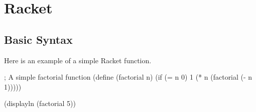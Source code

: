 
\section{Racket}

\lipsum[1] %

\subsection{Basic Syntax}
Here is an example of a simple Racket function.
\begin{racketcode}
; A simple factorial function
(define (factorial n)
  (if (= n 0)
      1
      (* n (factorial (- n 1)))))

(displayln (factorial 5))
\end{racketcode}

\lipsum[2]

